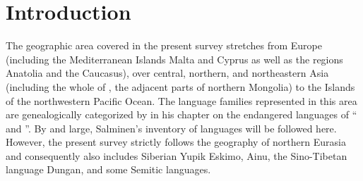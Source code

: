 
\chapter{Introduction}
The geographic area covered in the present survey stretches from Europe (including the Mediterranean Islands Malta and Cyprus as well as the regions Anatolia and the Caucasus), over central, northern, and northeastern Asia (including the whole of , the adjacent parts of northern Mongolia) to the Islands of the northwestern Pacific Ocean. The language families represented in this area are genealogically categorized by \cite{salminen2007} in his chapter on the endangered languages of “ and ”. By and large, Salminen's inventory of languages will be followed here. However, the present survey strictly follows the geography of northern Eurasia and consequently also includes Siberian Yupik Eskimo, Ainu, the Sino-Tibetan language Dungan, and some Semitic languages.

